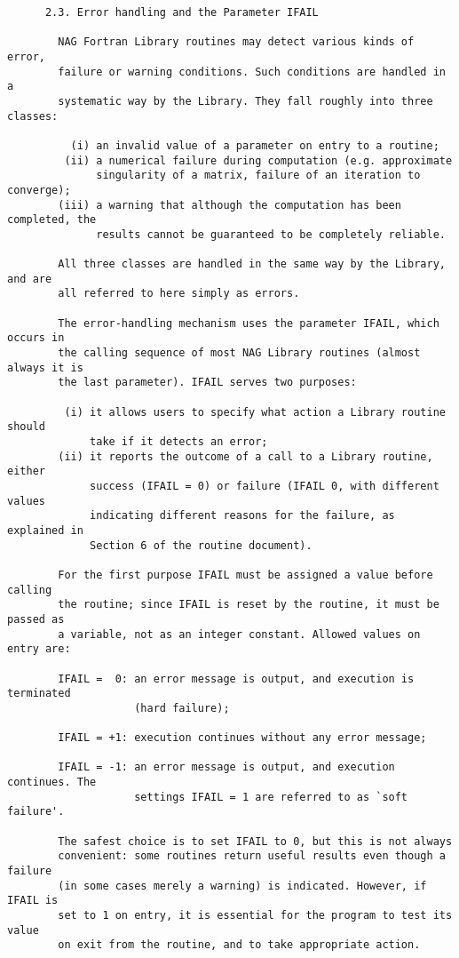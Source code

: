 \begin{small}
\begin{verbatim}
      2.3. Error handling and the Parameter IFAIL

        NAG Fortran Library routines may detect various kinds of error,
        failure or warning conditions. Such conditions are handled in a
        systematic way by the Library. They fall roughly into three classes:

          (i) an invalid value of a parameter on entry to a routine;
         (ii) a numerical failure during computation (e.g. approximate
              singularity of a matrix, failure of an iteration to converge);
        (iii) a warning that although the computation has been completed, the
              results cannot be guaranteed to be completely reliable.

        All three classes are handled in the same way by the Library, and are
        all referred to here simply as errors.

        The error-handling mechanism uses the parameter IFAIL, which occurs in
        the calling sequence of most NAG Library routines (almost always it is
        the last parameter). IFAIL serves two purposes:

         (i) it allows users to specify what action a Library routine should
             take if it detects an error;
        (ii) it reports the outcome of a call to a Library routine, either
             success (IFAIL = 0) or failure (IFAIL 0, with different values
             indicating different reasons for the failure, as explained in
             Section 6 of the routine document).

        For the first purpose IFAIL must be assigned a value before calling
        the routine; since IFAIL is reset by the routine, it must be passed as
        a variable, not as an integer constant. Allowed values on entry are:

        IFAIL =  0: an error message is output, and execution is terminated
                    (hard failure);

        IFAIL = +1: execution continues without any error message;

        IFAIL = -1: an error message is output, and execution continues. The
                    settings IFAIL = 1 are referred to as `soft failure'.

        The safest choice is to set IFAIL to 0, but this is not always
        convenient: some routines return useful results even though a failure
        (in some cases merely a warning) is indicated. However, if IFAIL is
        set to 1 on entry, it is essential for the program to test its value
        on exit from the routine, and to take appropriate action.


\end{verbatim}
\end{small}
